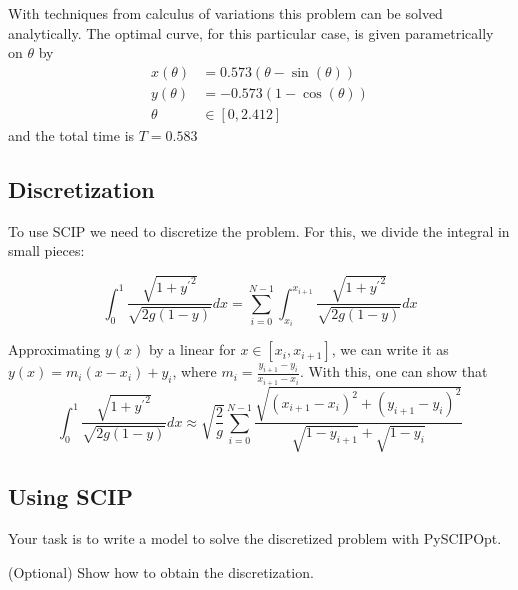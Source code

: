\documentclass[12pt]{article}
\begin{document}
With techniques from calculus of variations this problem can be solved analytically.
The optimal curve, for this particular case, is given parametrically on $\theta$ by
\begin{align*}
    x(\theta) &= 0.573 (\theta - \sin(\theta)) \\
    y(\theta) &= -0.573 (1 - \cos(\theta)) \\
       \theta &\in [0, 2.412]
\end{align*}
and the total time is $T = 0.583$

\subsection*{Discretization}

To use SCIP we need to discretize the problem.
For this, we divide the integral in small pieces:

\[
    \int_0^1 \frac{\sqrt{1 + {y^{'}}^2}}{\sqrt{2g(1 - y)}} dx = \sum_{i = 0}^{N-1} \int_{x_i}^{x_{i+1}} \frac{\sqrt{1 + {y^{'}}^2}}{\sqrt{2g(1 - y)}} dx
\]

Approximating $y(x)$ by a linear for $x \in [x_i, x_{i+1}]$, we can write it as $y(x) = m_i (x - x_i) + y_i$,
where $m_i = \tfrac{y_{i+1} - y_i}{x_{i+1} - x_i}$.
With this, one can show that
%
%
\[
    \int_0^1 \frac{\sqrt{1 + {y^{'}}^2}}{\sqrt{2g(1 - y)}} dx
    \approx
    \sqrt{\frac{2}{g}} \sum_{i = 0}^{N-1} \frac{\sqrt{(x_{i+1} - x_i)^2 + (y_{i+1} - y_i)^2}}{\sqrt{1 - y_{i+1}} + \sqrt{1 - y_{i}}}
\]

\subsection*{Using SCIP}

Your task is to write a model to solve the discretized problem with PySCIPOpt.

(Optional) Show how to obtain the discretization.
\end{document}
